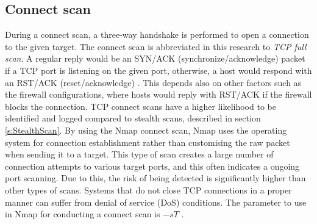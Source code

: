 \subsection{Connect scan}
\label{s:ConnectScan}
During a connect scan, a three-way handshake is performed to open a connection to the given target.
The connect scan is abbreviated in this research to \textit{TCP full scan}.
A regular reply would be an SYN/ACK (synchronize/acknowledge) packet if a TCP port is listening on the given port, otherwise, a host would respond with an RST/ACK (reset/acknowledge) \autocite{pinkard2008nmap, dabbagh2011slow}.
This depends also on other factors such as the firewall configurations, where hosts would reply with RST/ACK if the firewall blocks the connection. TCP connect scans have a higher likelihood to be identified and logged compared to stealth scans, described in section \ref{s:StealthScan}. By using the Nmap connect scan, Nmap uses the operating system for connection establishment rather than customising the raw packet when sending it to a target. This type of scan creates a large number of connection attempts to various target ports, and this often indicates a ongoing port scanning. Due to this, the risk of being detected is significantly higher than other types of scans. Systems that do not close TCP connections in a proper manner can suffer from denial of service (DoS) conditions. The parameter to use in Nmap for conducting a connect scan is $-sT$ \autocite{pinkard2008nmap}.